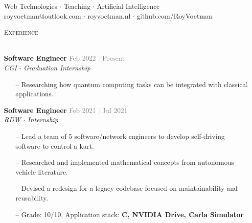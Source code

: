 \documentclass[a4paper]{article}
\newcommand{\lineunder} {
    \vspace*{-8pt} \\
    \hspace*{-18pt} \hrulefill \\
}
\newcommand{\header} [1] {
    {\hspace*{-18pt}\vspace*{6pt} \textsc{#1}}
    \vspace*{-6pt} \lineunder
}
\newcommand{\roundpic}[4][]{
  \tikz\node [circle, minimum width = #2,
    path picture = {
      \node [#1] at (path picture bounding box.center) {
        \texttt{[image: \#4]}};
    }] {};}
\begin{document}
\vspace*{-40pt}

    

\vspace*{-10pt}

\vspace{10mm}

\begin{center}
    \centering
    \raisebox{-0.5\height}{\roundpic{2cm}{2cm}{avatar.jpg}}
    \hspace*{.1in}
    
    \vspace*{10pt}
    {Web Technologies $\cdot$ Teaching $\cdot$ Artificial Intelligence}\\
    \vspace*{3pt}
	royvoetman@outlook.com $\cdot$ royvoetman.nl $\cdot$ github.com/RoyVoetman\\
\end{center}

\vspace{5mm}

\header{Experience}
\vspace{1mm}

\textbf{Software Engineer} \hfill \textcolor{gray}{Feb 2022 | Present}\\
\textit{CGI $\cdot$ Graduation Internship}\\
\vspace{-1mm}
\begin{itemize} \itemsep 1pt
    \item[--] Researching how quantum computing tasks can be integrated with classical applications.
\end{itemize}


\textbf{Software Engineer} \hfill \textcolor{gray}{Feb 2021 | Jul 2021}\\
\textit{RDW $\cdot$ Internship}\\
\vspace{-1mm}
\begin{itemize} \itemsep 1pt
    \item[--] Lead a team of 5 software/network engineers to develop self-driving software to control a kart.
	\item[--] Researched and implemented mathematical concepts from autonomous vehicle literature.
    \item[--] Devised a redesign for a legacy codebase focused on maintainability and reusability.
	\item[--] Grade: 10/10, Application stack: \textbf{C\scalebox{0.7}{++}, NVIDIA Drive, Carla Simulator}
\end{itemize}
\end{document}
